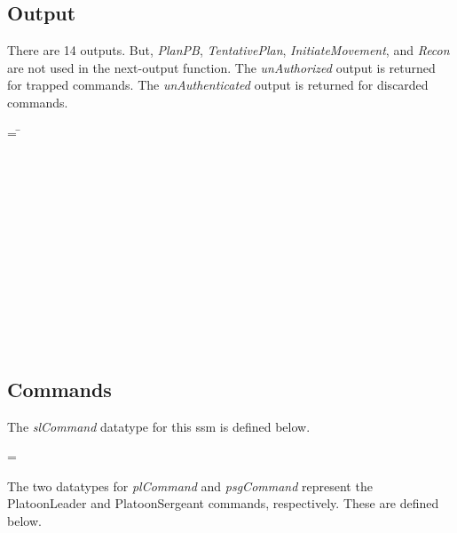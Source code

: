 \documentclass[../../main/main.tex]{subfiles}
\begin{document}
\subsection{Output}
There are 14 outputs.  But, \textit{PlanPB}, \textit{TentativePlan}, \textit{InitiateMovement}, and \textit{Recon} are not used in the next-output function.  The \textit{unAuthorized} output is returned for trapped commands.  The \textit{unAuthenticated} output is returned for discarded commands.

\begin{tabbing}
\parskip=8pt
 =  \= \\
					\>\HOLTokenBar{}  \\
					\>\HOLTokenBar{}  \\
					\>\HOLTokenBar{} \\
         				\>\HOLTokenBar{}  \\
					\>\HOLTokenBar{}  \\
					\>\HOLTokenBar{}  \\
					\>\HOLTokenBar{} \\
         				\>\HOLTokenBar{}  \\
					\>\HOLTokenBar{}  \\
					\>\HOLTokenBar{}  \\
					\>\HOLTokenBar{} \\
         				\>\HOLTokenBar{}  \\
					\>\HOLTokenBar{} 
\parskip=18pt
\end{tabbing}

\subsection{Commands}
The \textit{slCommand} datatype for this \gls{ssm} is defined below.

 =   \HOLTokenBar{}  

The two datatypes for \textit{plCommand} and \textit{psgCommand} represent the PlatoonLeader and PlatoonSergeant commands, respectively. These are defined below.
\end{document}
